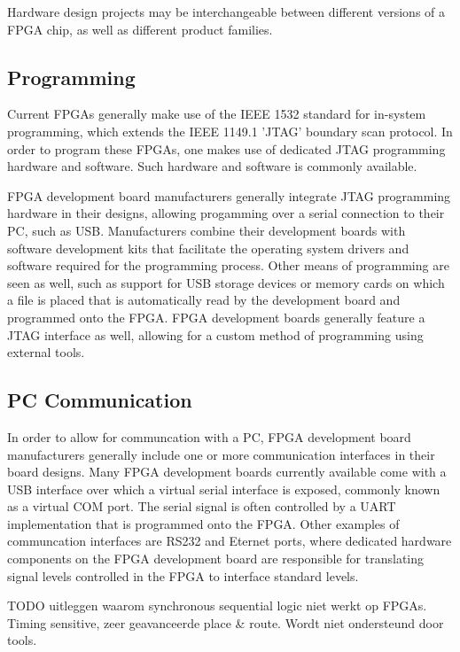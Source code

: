\documentclass[openright]{uva-bachelor-thesis}
\begin{document}
Hardware design projects may be interchangeable between different versions of a FPGA chip, as well as different product families.

\subsection{Programming}
Current FPGAs generally make use of the IEEE 1532 standard for in-system programming, which extends the IEEE 1149.1 'JTAG' boundary scan protocol. In order to program these FPGAs, one makes use of dedicated JTAG programming hardware and software. Such hardware and software is commonly available.  

FPGA development board manufacturers generally integrate JTAG programming hardware in their designs, allowing progamming over a serial connection to their PC, such as USB. Manufacturers combine their development boards with software development kits that facilitate the operating system drivers and software required for the programming process. Other means of programming are seen as well, such as support for USB storage devices or memory cards on which a file is placed that is automatically read by the development board and programmed onto the FPGA. FPGA development boards generally feature a JTAG interface as well, allowing for a custom method of programming using external tools. 

\subsection{PC Communication}
In order to allow for communcation with a PC, FPGA development board manufacturers generally include one or more communication interfaces in their board designs. Many FPGA development boards currently available come with a USB interface over which a virtual serial interface is exposed, commonly known as a virtual COM port. The serial signal is often controlled by a UART implementation that is programmed onto the FPGA. Other examples of communcation interfaces are RS232 and Eternet ports, where dedicated hardware components on the FPGA development board are responsible for translating signal levels controlled in the FPGA to interface standard levels. 

TODO uitleggen waarom synchronous sequential logic niet werkt op FPGAs. Timing sensitive, zeer geavanceerde place \& route. Wordt niet ondersteund door tools. 

\end{document}
